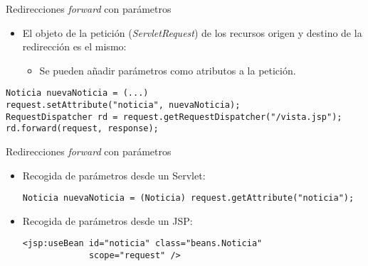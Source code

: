 \begin{slide}{Redirecciones \emph{forward} con parámetros}
  \begin{itemize}
  \item El objeto de la petición (\emph{ServletRequest}) de los recursos
   origen y destino de la redirección es el mismo:
   \begin{itemize}
   \item Se pueden añadir parámetros como atributos a la petición.
   \end{itemize}
 \end{itemize}
\begin{Verbatim}[fontfamily=tt,fontsize=\fontsize{8}{8}]
Noticia nuevaNoticia = (...)
request.setAttribute("noticia", nuevaNoticia);
RequestDispatcher rd = request.getRequestDispatcher("/vista.jsp");
rd.forward(request, response);
\end{Verbatim}

\end{slide}

\begin{slide}{Redirecciones \emph{forward} con parámetros}
  \begin{itemize}
  \item Recogida de parámetros desde un Servlet:
\begin{Verbatim}[fontfamily=tt,fontsize=\fontsize{8}{8}]
Noticia nuevaNoticia = (Noticia) request.getAttribute("noticia");
\end{Verbatim}
\item Recogida de parámetros desde un JSP:
\begin{Verbatim}[fontfamily=tt,fontsize=\fontsize{8}{8}]
<jsp:useBean id="noticia" class="beans.Noticia" 
             scope="request" />
\end{Verbatim}

  \end{itemize}
\end{slide}





